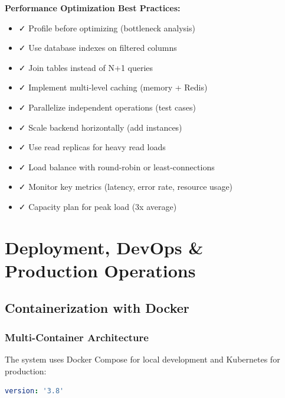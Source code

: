 \documentclass[12pt,a4paper,oneside]{article}
\begin{document}
{{\begin{importantbox}
\textbf{Performance Optimization Best Practices:}

\begin{itemize}
    \item ✓ Profile before optimizing (bottleneck analysis)
    \item ✓ Use database indexes on filtered columns
    \item ✓ Join tables instead of N+1 queries
    \item ✓ Implement multi-level caching (memory + Redis)
    \item ✓ Parallelize independent operations (test cases)
    \item ✓ Scale backend horizontally (add instances)
    \item ✓ Use read replicas for heavy read loads
    \item ✓ Load balance with round-robin or least-connections
    \item ✓ Monitor key metrics (latency, error rate, resource usage)
    \item ✓ Capacity plan for peak load (3x average)
\end{itemize}
\end{importantbox}

\newpage


\section{Deployment, DevOps \& Production Operations}

\subsection{Containerization with Docker}

\subsubsection{Multi-Container Architecture}

The system uses Docker Compose for local development and Kubernetes for production:

\begin{lstlisting}[language=YAML, caption=docker-compose.yml]
version: '3.8'


\end{lstlisting}}}
\end{document}

